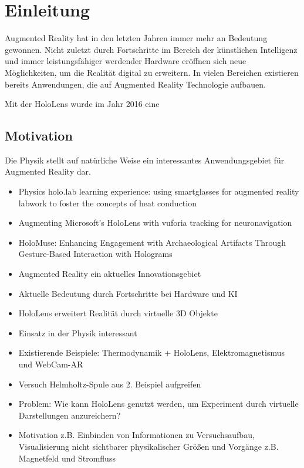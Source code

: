 \section{Einleitung}
\label{sec-1}

Augmented Reality hat in den letzten Jahren immer mehr an Bedeutung gewonnen. Nicht zuletzt durch Fortschritte im Bereich der künstlichen Intelligenz und immer leistungsfähiger werdender Hardware eröffnen sich neue Möglichkeiten, um die Realität digital zu erweitern. In vielen Bereichen existieren bereits Anwendungen, die auf Augmented Reality Technologie aufbauen. 

Mit der HoloLens wurde im Jahr 2016 eine 

\subsection{Motivation}
\label{sec-1-1}
Die Physik stellt auf natürliche Weise ein interessantes Anwendungsgebiet für Augmented Reality dar. 

\begin{itemize}
	\item Physics holo.lab learning experience: using smartglasses for augmented reality labwork to foster the concepts of heat conduction \cite{Strzys18}
	\item Augmenting Microsoft's HoloLens with vuforia tracking for neuronavigation \cite{Frantz18}
	\item HoloMuse: Enhancing Engagement with Archaeological Artifacts Through Gesture-Based Interaction with Holograms \cite{Pollalis17}
\end{itemize}

\begin{itemize}
	\item Augmented Reality ein aktuelles Innovationsgebiet
	\item Aktuelle Bedeutung durch Fortschritte bei Hardware und KI
	\item HoloLens erweitert Realität durch virtuelle 3D Objekte
	\item Einsatz in der Physik interessant
	\item Existierende Beispiele: Thermodynamik + HoloLens, Elektromagnetismus und WebCam-AR
	\item Versuch Helmholtz-Spule aus 2. Beispiel aufgreifen
	\item Problem: Wie kann HoloLens genutzt werden, um Experiment durch virtuelle Darstellungen anzureichern?
	\item Motivation z.B. Einbinden von Informationen zu Versuchsaufbau, Visualisierung nicht sichtbarer physikalischer Größen und Vorgänge z.B. Magnetfeld und Stromfluss
\end{itemize}

